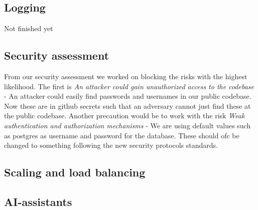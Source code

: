 \subsection{Logging}
Not finished yet

\subsection{Security assessment}
From our security assessment we worked on blocking the risks with the highest likelihood. The first is \textit{An attacker could gain unauthorized access to the codebase}
- An attacker could easily find passwords and usernames in our public codebase. Now these are in github secrets such that an adversary cannot just 
find these at the public codebase. Another precaution would be to work with the risk \textit{Weak authentication and authorization mechanisms}
 - We are using default values such as postgres as username and password for the database. These should ofc be changed to something following the
 new security protocols standards. 

 \subsection{Scaling and load balancing}

 \subsection{AI-assistants}